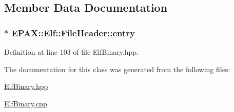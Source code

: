 \subsection{\-Member \-Data \-Documentation}
\hypertarget{class_e_p_a_x_1_1_elf_1_1_file_header_a7c2db25209f5833010086dcfe200e67e}{
\subsubsection[{entry}]{$\ast$ {\bf \-E\-P\-A\-X\-::\-Elf\-::\-File\-Header\-::entry}}}\label{class_e_p_a_x_1_1_elf_1_1_file_header_a7c2db25209f5833010086dcfe200e67e}


\-Definition at line 103 of file \-Elf\-Binary.\-hpp.



\-The documentation for this class was generated from the following files\-:\begin{DoxyCompactItemize}
\item 
\hyperlink{_elf_binary_8hpp}{\-Elf\-Binary.\-hpp}\item 
\hyperlink{_elf_binary_8cpp}{\-Elf\-Binary.\-cpp}\end{DoxyCompactItemize}
